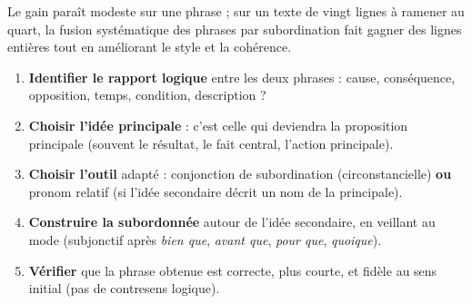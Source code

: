 \documentclass[11pt]{article}
\begin{document}
Le gain paraît modeste sur une phrase ; sur un texte de vingt lignes à ramener au quart, la fusion systématique des phrases par subordination fait gagner des lignes entières tout en améliorant le style et la cohérence.

\begin{methode}
\begin{enumerate}
\item \textbf{Identifier le rapport logique} entre les deux phrases : cause, conséquence, opposition, temps, condition, description ?
\item \textbf{Choisir l'idée principale} : c'est celle qui deviendra la proposition principale (souvent le résultat, le fait central, l'action principale).
\item \textbf{Choisir l'outil} adapté : conjonction de subordination (circonstancielle) \textbf{ou} pronom relatif (si l'idée secondaire décrit un nom de la principale).
\item \textbf{Construire la subordonnée} autour de l'idée secondaire, en veillant au mode (subjonctif après \emph{bien que}, \emph{avant que}, \emph{pour que}, \emph{quoique}).
\item \textbf{Vérifier} que la phrase obtenue est correcte, plus courte, et fidèle au sens initial (pas de contresens logique).
\end{enumerate}
\end{methode}
\end{document}

